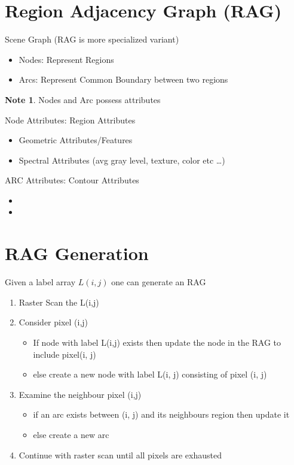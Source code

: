 \documentclass[11pt]{article}
\theoremstyle{definition}
\newtheorem*{unnote}{Note}  %
\begin{document}
\section{Region Adjacency Graph (RAG)}
Scene Graph (RAG is more specialized variant)

\begin{itemize}
    \item Nodes: Represent Regions
    \item Arcs: Represent Common Boundary between two regions
\end{itemize}

\begin{unnote}
    Nodes and Arc possess attributes
\end{unnote} 
Node Attributes: Region Attributes
\begin{itemize}
    \item Geometric Attributes/Features
    \item Spectral Attributes (avg gray level, texture, color etc \ldots)
\end{itemize}

ARC Attributes: Contour Attributes
\begin{itemize}
    \item 
    \item 
\end{itemize}

\newpage
\section*{RAG Generation}
Given a label array $L(i,j)$ one can generate an RAG
\begin{enumerate}
    \item Raster Scan the L(i,j)
    \item Consider pixel (i,j)
    \begin{itemize}
        \item If node with label L(i,j) exists then update the node in the RAG to include pixel(i, j)
        \item else create a new node with label L(i, j) consisting of pixel (i, j)
    \end{itemize}
    \item Examine the neighbour pixel (i,j)
    \begin{itemize}
        \item if an arc exists between (i, j) and its neighbours region then update it
        \item else create a new arc
    \end{itemize}
    \item Continue with raster scan until all pixels are exhausted
\end{enumerate}
\end{document}
